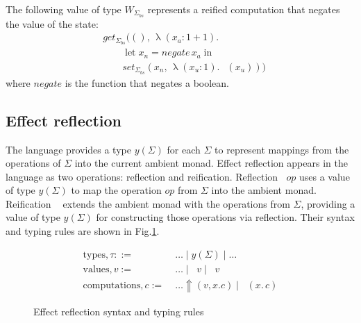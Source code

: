 \documentclass[acmsmall, screen, nonacm]{acmart}
\theoremstyle{definition}
\newcommand{\glob}{\mathop{\Box}}
\newcommand{\yoneda}[1]{y(#1)}
\newcommand{\reflectname}{\Uparrow}
\newcommand{\reflectraw}[1]{\mathop{\reflectname_{#1}}}
\newcommand{\performraw}[2]{\mathop{\reflectname(#1(#2))}}
\newcommand{\perform}[5]{\performraw{#1}{#2}(#3, #4. #5)}
\newcommand{\reifyname}{\Downarrow}
\newcommand{\reifyraw}[1]{\mathop{\reifyname_{#1}}}
\newcommand{\reify}[3]{\reifyraw{#1}(#2.\,#3)}
\newcommand{\outl}[1]{\mathop{\mathrm{out}_L} #1}
\newcommand{\outr}[1]{\mathop{\mathrm{out}_R} #1}
\newcommand{\ind}[1]{W_{#1}}
\newcommand{\indintro}[4]{#2_{#1}(#3,\, #4)}
\newcommand{\retname}{\mathrm{ret}}
\newcommand{\ret}[2]{\mathop{\retname_{#1}}(#2)}
\newcommand{\abs}[3]{\mathop{\lambda}(#1 \types #2).\,#3}
\newcommand{\app}[2]{#1\,#2}
\newcommand{\types}{\mathrel{:}}
\newcommand{\ccons}[2]{#1;\,#2}
\newcommand{\lbind}[3]{\ccons{#1}{#2\types#3}}
\newcommand{\letv}[3]{\mathop{\mathrm{let}} #1 = #2 \mathop{\mathrm{in}} #3}
\newcommand{\turnv}{\mathrel{\vdash_V}}
\newcommand{\turnc}{\mathrel{\vdash_C}}
\begin{document}
\begin{example}
  \label{example:negate}
  The following value of type $\ind{\Sigma_{bs}}$ represents a
  reified computation that negates the value of the state:
  \begin{align*}
    &\indintro{\Sigma_{bs}}{get}{()}{\abs{x_a}{1 + 1}{\\
        &\qquad \letv{x_n}{\app{\mathit{negate}}{x_a}}{\\
          &\qquad \indintro{\Sigma_{bs}}{set}{x_n}{\abs{x_u}{1}{\ret{\Sigma_{bs}}{x_u}}}}}}
  \end{align*}
  where $\mathit{negate}$ is the function that negates a boolean.
\end{example}

\subsection{Effect reflection}

The language provides a type $\yoneda{\Sigma}$ for each $\Sigma$ to
represent mappings from the operations of $\Sigma$ into the current
ambient monad. Effect reflection appears in the language as two
operations: reflection and reification. Reflection
$\reflectraw{\Sigma}{op}$ uses a value of type $\yoneda{\Sigma}$ to map
the operation $op$ from $\Sigma$ into the ambient monad.  Reification
$\reifyraw{\Sigma}$ extends the ambient monad with the operations from
$\Sigma$, providing a value of type $\yoneda{\Sigma}$ for constructing
those operations via reflection. Their syntax and typing rules are shown
in Fig.\ref{fig:typing-reflection}.

\begin{figure}
\begin{align*}
  \mathrm{types}, \tau ::=\;& \ldots \mid \yoneda{\Sigma} \mid \ldots \\
  \mathrm{values}, v :=\;& \ldots \mid \outl{v} \mid \outr{v} \\
  \mathrm{computations}, c :=\;& \ldots \perform{v}{op}{v}{x}{c} \mid \reify{\Sigma}{x}{c}
\end{align*}
\caption{Effect reflection syntax and typing rules}
\label{fig:typing-reflection}
\end{figure}
\end{document}
